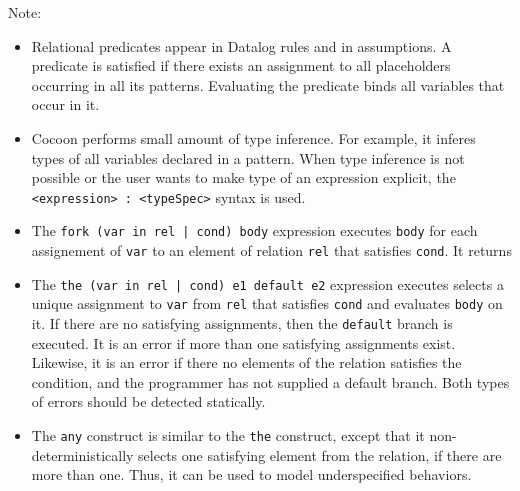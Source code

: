 \documentclass{report}
\newcommand{\src}[1]{\texttt{#1}}
\begin{document}
Note:
\begin{itemize}
    \item Relational predicates appear in Datalog rules and in assumptions.
        A predicate is satisfied if there exists an assignment to all 
        placeholders occurring in all its patterns.  Evaluating the predicate
        binds all variables that occur in it.
    \item Cocoon performs small amount of type inference.  For example, it
        inferes types of all variables declared in a pattern.  When type 
        inference is not possible or the user wants to make type of an expression
        explicit, the \src{<expression> : <typeSpec>} syntax is used.
    \item The \src{fork (var in rel | cond) body} expression executes \src{body}
        for each assignement of \src{var} to an element of relation \src{rel}
        that satisfies \src{cond}.  It returns 
    \item The \src{the (var in rel | cond) e1 default e2} expression executes 
        selects a unique assignment to \src{var} from \src{rel} that satisfies
        \src{cond} and evaluates \src{body} on it.  If there are no satisfying 
        assignments, then the \src{default} branch is executed.  It is an error 
        if more than one satisfying assignments exist.  Likewise, it is an error
        if there no elements of the relation satisfies the condition, and the 
        programmer has not supplied a default branch.  Both types of errors should
        be detected statically.
    \item The \src{any} construct is similar to the \src{the} construct, except
        that it non-deterministically selects one satisfying element from the relation,
        if there are more than one.  Thus, it can be used to model underspecified
        behaviors.
\end{itemize}
\end{document}
